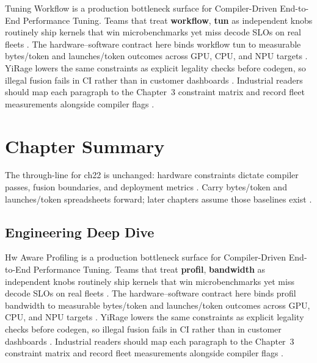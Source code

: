 Tuning Workflow is a production bottleneck surface for Compiler-Driven End-to-End Performance Tuning. Teams that treat \textbf{workflow}, \textbf{tun} as independent knobs routinely ship kernels that win microbenchmarks yet miss decode SLOs on real fleets \citep{nvidia2022hopper,amd2024aie}. The hardware--software contract here binds workflow tun to measurable bytes/token and launches/token outcomes across GPU, CPU, and NPU targets \citep{semianalysis2024tma,dlbook}. YiRage lowers the same constraints as explicit legality checks before codegen, so illegal fusion fails in CI rather than in customer dashboards \citep{amd2024xdna,dao2022flashattention}. Industrial readers should map each paragraph to the Chapter~3 constraint matrix and record fleet measurements alongside compiler flags \citep{amd2024aie,kwon2023vllm}.

\section{Chapter Summary}
\label{sec:ch22_summary}

The through-line for ch22 is unchanged: hardware constraints dictate compiler passes, fusion boundaries, and deployment metrics \citep{memoryfloor2026,amd2024xdna}. Carry bytes/token and launches/token spreadsheets forward; later chapters assume those baselines exist \citep{semianalysis2024tma,dlbook}.


\subsection{Engineering Deep Dive}
\label{sec:ch22_deep_dive}

Hw Aware Profiling is a production bottleneck surface for Compiler-Driven End-to-End Performance Tuning. Teams that treat \textbf{profil}, \textbf{bandwidth} as independent knobs routinely ship kernels that win microbenchmarks yet miss decode SLOs on real fleets \citep{semianalysis2024tma,dlbook}. The hardware--software contract here binds profil bandwidth to measurable bytes/token and launches/token outcomes across GPU, CPU, and NPU targets \citep{amd2024xdna,dao2022flashattention}. YiRage lowers the same constraints as explicit legality checks before codegen, so illegal fusion fails in CI rather than in customer dashboards \citep{amd2024aie,kwon2023vllm}. Industrial readers should map each paragraph to the Chapter~3 constraint matrix and record fleet measurements alongside compiler flags \citep{dlbook,nvidia2024cudagraphs}.

